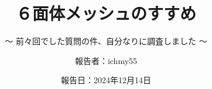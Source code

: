 %
\title{６面体メッシュのすすめ}
\subtitle{～ 前々回でした質問の件、自分なりに調査しました ～}
%
\def\logoC{opencae-logo.png}
%
%
%
\date[Dec.14th,2024]{報告日：2024年12月14日}
\author[ichmy55]{報告者：ichmy55}
\subject{Recommendation for hexahedral mesh}
